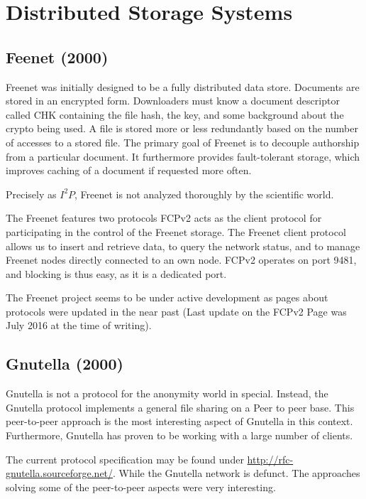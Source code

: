 \section{Distributed Storage Systems}
\subsection{Feenet (2000)}
Freenet was initially designed to be a fully distributed data store\cite{freenet}. Documents are stored in an encrypted form. Downloaders must know a document descriptor called CHK containing the file hash, the key, and some background about the crypto being used. A file is stored more or less redundantly based on the number of accesses to a stored file. The primary goal of Freenet is to decouple authorship from a particular document. It furthermore provides fault-tolerant storage, which improves caching of a document if requested more often.

Precisely as $I^2P$, Freenet is not analyzed thoroughly by the scientific world. 

The Freenet features two protocols FCPv2 acts as the client protocol for participating in the control of the Freenet storage. The Freenet client protocol allows us to insert and retrieve data, to query the network status, and to manage Freenet nodes directly connected to an own node. FCPv2 operates on port 9481, and blocking is thus easy, as it is a dedicated port. 

The Freenet project seems to be under active development as pages about protocols were updated in the near past (Last update on the FCPv2 Page was July  2016 at the time of writing).

\subsection{Gnutella (2000)}
Gnutella is not a protocol for the anonymity world in special. Instead, the Gnutella protocol implements a general file sharing on a Peer to peer base. This peer-to-peer approach is the most interesting aspect of Gnutella in this context. Furthermore, Gnutella has proven to be working with a large number of clients.

The current protocol specification may be found under \href{http://rfc-gnutella.sourceforge.net/developer/stable/index.html}{http://rfc-gnutella.sourceforge.net/}. While the Gnutella network is defunct. The approaches solving some of the peer-to-peer aspects were very interesting.

